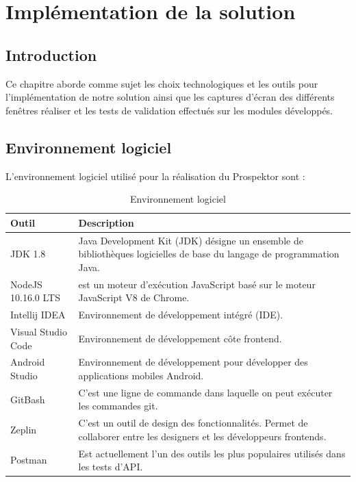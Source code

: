 \chapter{Impl\'ementation de la solution}

\section{Introduction}

Ce chapitre aborde comme sujet les choix technologiques et les outils pour l'impl\'ementation de notre solution ainsi que les captures d'\'ecran des diff\'erents fen\^etres r\'ealiser et les tests de validation effectu\'es sur les modules d\'evelopp\'es.

\section{Environnement logiciel}
L'environnement logiciel utilis\'e pour la r\'ealisation du Prospektor sont :

\begin{table}[H]
\begin{center}
\begin{tabularx}{\textwidth}{ |l|X| }
\hline Outil & Description \\\hline \hline
JDK 1.8 & Java Development Kit (JDK) d\'esigne un ensemble de biblioth\`eques logicielles de base du langage de programmation Java.\\ \hline
NodeJS 10.16.0 LTS & est un moteur d'ex\'ecution JavaScript bas\'e sur le moteur JavaScript V8 de Chrome.\\ \hline
Intellij IDEA & Environnement de d\'eveloppement int\'egr\'e (IDE).\\ \hline
Visual Studio Code & Environnement de d\'eveloppement c\^ote frontend.\\ \hline
Android Studio & Environnement de d\'eveloppement pour d\'evelopper des applications mobiles Android.\\ \hline
GitBash & C'est une ligne de commande dans laquelle on peut ex\'ecuter les commandes git.\\ \hline
Zeplin & C'est un outil de design des fonctionnalit\'es. Permet de collaborer entre les designers et les d\'eveloppeurs frontends.\\ \hline
Postman & Est actuellement l'un des outils les plus populaires utilis\'es dans les tests d'\gls{API}.\\
\hline
\end{tabularx}
\caption{Environnement logiciel}
\end{center}
\end{table}

